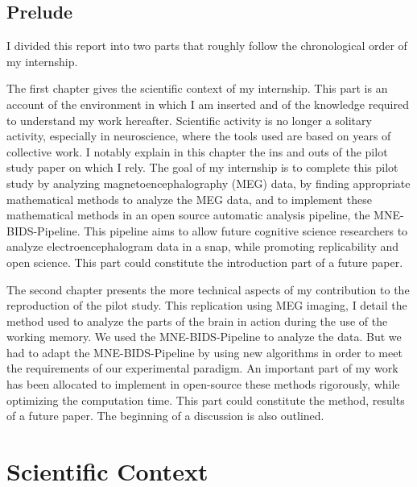 \section*{Prelude}

I divided this report into two parts that roughly follow the chronological order of my internship.

The first chapter gives the scientific context of my internship. This part is an account of the environment in which I am inserted and of the knowledge required to understand my work hereafter. Scientific activity is no longer a solitary activity, especially in neuroscience, where the tools used are based on years of collective work. I notably explain in this chapter the ins and outs of the pilot study paper \cite{herbst2021abstracting} on which I rely. The goal of my internship is to complete this pilot study by analyzing magnetoencephalography (MEG) data, by finding appropriate mathematical methods to analyze the MEG data, and to implement these mathematical methods in an open source automatic analysis pipeline, the MNE-BIDS-Pipeline. This pipeline aims to allow future cognitive science researchers to analyze electroencephalogram data in a snap, while promoting replicability and open science. This part could constitute the introduction part of a future paper.

The second chapter presents the more technical aspects of my contribution to the reproduction of the pilot study. This replication using MEG imaging, I detail the method used to analyze the parts of the brain in action during the use of the working memory. We used the MNE-BIDS-Pipeline to analyze the data. But we had to adapt the MNE-BIDS-Pipeline by using new algorithms in order to meet the requirements of our experimental paradigm. An important part of my work has been allocated to implement in open-source these methods rigorously, while optimizing the computation time. This part could constitute the method, results of a future paper. The beginning of a discussion is also outlined.

\chapter{Scientific Context}


